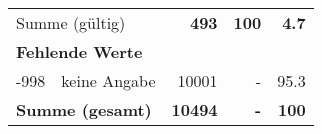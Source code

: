 \begin{longtable}{lXrrr}
     \midrule
     \multicolumn{2}{l}{Summe (gültig)} &
       \textbf{\num{493}} &
     \textbf{\num{100}} &
       \textbf{\num[round-mode=places,round-precision=2]{4.7}} \\
     \multicolumn{5}{l}{\textbf{Fehlende Werte}}\\
       -998 &
       keine Angabe &
         \num{10001} &
        - &
         \num[round-mode=places,round-precision=2]{95.3} \\
     \midrule
     \multicolumn{2}{l}{\textbf{Summe (gesamt)}} &
          \textbf{\num{10494}} &
        \textbf{-} &
        \textbf{\num{100}} \\
     \bottomrule
     \end{longtable}
     
